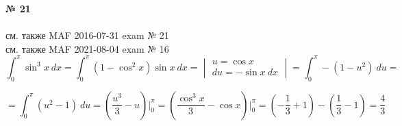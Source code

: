 \documentclass{article}
\begin{document}
\textbf{№ 21} 
\\
\\ см. также {\color{blue}MAF} 2016-07-31 exam № 21
\\ см. также {\color{blue}MAF} 2021-08-04 exam № 16
\\
$$ \int_{0}^{\pi} \sin^3{x} \ dx 
= \int_{0}^{\pi} \left( 1 - \cos^2{x} \right)\sin{x} \ dx 
= \begin{vmatrix} u = \cos{x} \\
                 du = -\sin{x} \ dx \end{vmatrix}
= \int_{0}^{\pi} -\left( 1 - u^2 \right) \ du
= $$

$$ = \int_{0}^{\pi} \left( u^2 - 1 \right) \ du
= \left( \frac{u^3}{3} - u \right) \bigg\vert_{0}^{\pi}
= \left( \frac{\cos^3{x}}{3} - \cos{x} \right) \bigg\vert_{0}^{\pi} 
= \left( -\frac{1}{3} + 1 \right) - \left( \frac{1}{3} - 1 \right)
= \frac{4}{3} $$
\end{document}
